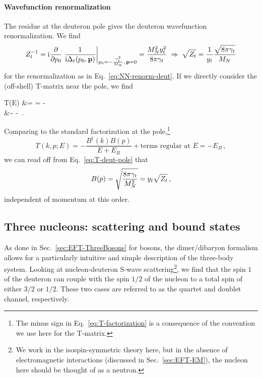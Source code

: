 \paragraph{Wavefunction renormalization}

The residue at the deuteron pole gives the deuteron wavefunction 
renormalization.  We find
%
\begin{equation}
 Z_t^{-1} = \ii\frac{\partial}{\partial p_0}
 \left.\frac{1}{\ii\Delta_t(p_0,\vp)}\right|_{p_0=-\frac{\gamt^2}{\MN},\,\vp=0}
 = \frac{\MN^2 \yt^2}{8\pi\gamt}
 \;\Rightarrow\;
 \sqrt{Z_t} = \frac{1}{\yt} \frac{\sqrt{8\pi\gamt\mathstrut}}{\MN}
\label{eq:Zd}
\end{equation}
%
for the renormalization as in Eq.~\eqref{eq:NN-renorm-deut}.  If we 
directly consider the (off-shell) T-matrix near the pole, we find
%
\begin{spliteq}
 T(E) &= \frac{4\pi}{\MN}
 = {-}\frac{4\pi}{\MN}
  \\
 &\sim
 {-} 
  \,.
\label{eq:T-deut-pole}
\end{spliteq}
%
Comparing to the standard factorization at the pole,\footnote{The minus sign in 
Eq.~\eqref{eq:T-factorization} is a consequence of the convention we use here 
for the T-matrix.}
%
\begin{equation}
 T(k,p;E) = {-}\frac{B^\dagger(k)B(p)}{E+E_B}
 + \text{terms regular at $E=-E_B$} \,,
\label{eq:T-factorization}
\end{equation}
%
we can read off from Eq.~\eqref{eq:T-deut-pole} that
%
\begin{equation}
 B(p) = \sqrt{\frac{8\pi\gamt}{\MN^2}} = \yt\sqrt{Z_t} \,,
\label{eq:B-deut}
\end{equation}
%
independent of momentum at this order.

\subsection{Three nucleons: scattering and bound states}

As done in Sec.~\ref{sec:EFT-ThreeBosons} for bosons, the dimer/dibaryon 
formalism allows for a particularly intuitive and simple description of the 
three-body system.  Looking at nucleon-deuteron S-wave scattering\footnote{We 
work in the isospin-symmetric theory here, but in the absence of 
electromagnetic interactions (discussed in Sec.~\ref{sec:EFT-EM}), the nucleon 
here should be thought of as a neutron.}, we find that the spin $1$ of the 
deuteron can couple with the spin $1/2$ of the nucleon to a total spin of 
either $3/2$ or $1/2$.  These two cases are referred to as the quartet and 
doublet channel, respectively.

